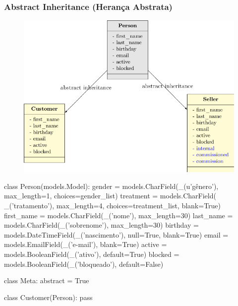 \documentclass[aspectratio=169]{beamer}
\begin{document}
{\begin{frame}
\end{frame}

\begin{frame}\frametitle{Abstract Inheritance (Herança Abstrata)}

	\begin{figure}[h]
	  \centering
  		\includegraphics[height=.9\paperheight]{img/051abstract}
	\end{figure}

\end{frame}

\begin{frame}[fragile]
	
\begin{pythoncode}
class Person(models.Model):
    gender = models.CharField(_(u'gênero'), max_length=1, choices=gender_list)
    treatment = models.CharField(
        _('tratamento'), max_length=4, choices=treatment_list, blank=True)
    first_name = models.CharField(_('nome'), max_length=30)
    last_name = models.CharField(_('sobrenome'), max_length=30)
    birthday = models.DateTimeField(_('nascimento'), null=True, blank=True)
    email = models.EmailField(_('e-mail'), blank=True)
    active = models.BooleanField(_('ativo'), default=True)
    blocked = models.BooleanField(_('bloqueado'), default=False)

class Meta:
    abstract = True


class Customer(Person):
    pass
\end{pythoncode}

\end{frame}

\begin{frame}[fragile]


\end{frame}}
\end{document}
